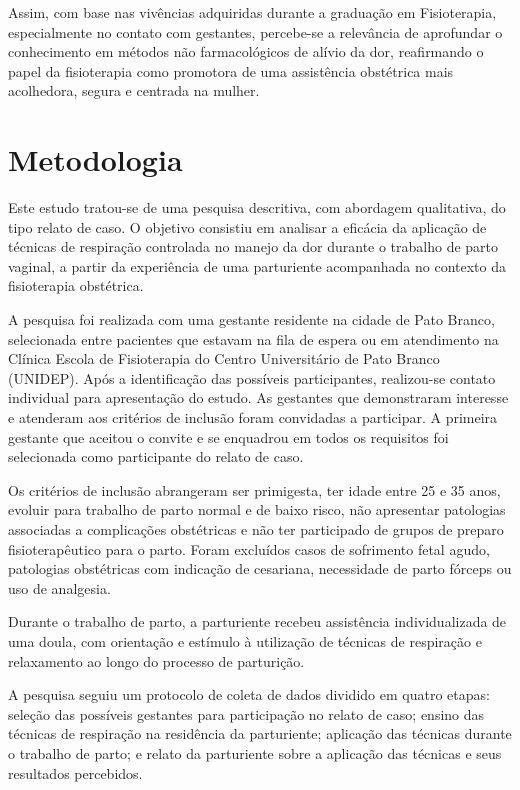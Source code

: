 \documentclass[openright]{normas-utf-tex}
\begin{document}
Assim, com base nas vivências adquiridas durante a graduação em Fisioterapia, especialmente no contato com gestantes, percebe-se a relevância de aprofundar o conhecimento em métodos não farmacológicos de alívio da dor, reafirmando o papel da fisioterapia como promotora de uma assistência obstétrica mais acolhedora, segura e centrada na mulher.

\chapter{Metodologia}
\label{chap:metodologia}

Este estudo tratou-se de uma pesquisa descritiva, com abordagem qualitativa, do tipo relato de caso. O objetivo consistiu em analisar a eficácia da aplicação de técnicas de respiração controlada no manejo da dor durante o trabalho de parto vaginal, a partir da experiência de uma parturiente acompanhada no contexto da fisioterapia obstétrica.

A pesquisa foi realizada com uma gestante residente na cidade de Pato Branco, selecionada entre pacientes que estavam na fila de espera ou em atendimento na Clínica Escola de Fisioterapia do Centro Universitário de Pato Branco (UNIDEP). Após a identificação das possíveis participantes, realizou-se contato individual para apresentação do estudo. As gestantes que demonstraram interesse e atenderam aos critérios de inclusão foram convidadas a participar. A primeira gestante que aceitou o convite e se enquadrou em todos os requisitos foi selecionada como participante do relato de caso.

Os critérios de inclusão abrangeram ser primigesta, ter idade entre 25 e 35 anos, evoluir para trabalho de parto normal e de baixo risco, não apresentar patologias associadas a complicações obstétricas e não ter participado de grupos de preparo fisioterapêutico para o parto. Foram excluídos casos de sofrimento fetal agudo, patologias obstétricas com indicação de cesariana, necessidade de parto fórceps ou uso de analgesia.

Durante o trabalho de parto, a parturiente recebeu assistência individualizada de uma doula, com orientação e estímulo à utilização de técnicas de respiração e relaxamento ao longo do processo de parturição.

A pesquisa seguiu um protocolo de coleta de dados dividido em quatro etapas: seleção das possíveis gestantes para participação no relato de caso; ensino das técnicas de respiração na residência da parturiente; aplicação das técnicas durante o trabalho de parto; e relato da parturiente sobre a aplicação das técnicas e seus resultados percebidos.
\end{document}

